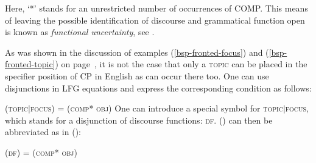 \noindent
Here, `*'\is{*} stands for an unrestricted number of occurrences of \mbox{\small COMP}. This means of leaving the possible identification of discourse and grammatical function open is known
as \emph{functional uncertainty}, see .

As was shown in the discussion of examples (\ref{bsp-fronted-focus}) and (\ref{bsp-fronted-topic}) on
page~\pageref{bsp-fronted-focus}, it is not the case that only a \textsc{topic} can be placed in the specifier position of CP in English as \focus can occur there too.
One can use disjunctions in LFG equations and express the corresponding condition as follows:

\ea
(\upsp  \textsc{topic$|$focus}) = (\upsp \textsc{comp* obj})
\z
One can introduce a special symbol for \textsc{topic$|$focus}, which stands for a disjunction of discourse functions: \textsc{df}.
() can then be abbreviated as in ():

\ea
(\upsp  \textsc{df}) = (\upsp \textsc{comp* obj})
\z

